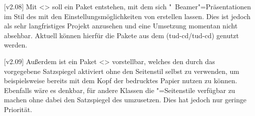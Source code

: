 [v2.08]
Mit <> soll ein Paket entstehen, mit dem sich
"~Beamer"=Präsentationen im Stil des \TUDCDs mit den 
Einstellungsmöglichkeiten von \TUDScript erstellen lassen. Dies ist jedoch als 
sehr langfristiges Projekt anzusehen und eine Umsetzung momentan nicht 
absehbar. Aktuell können hierfür die Pakete aus dem \GitHubRepo(tud-cd/tud-cd) 
genutzt werden.

[v2.09]
Außerdem ist ein Paket <> vorstellbar, welches den durch 
das \CD vorgegebene Satzspiegel aktiviert ohne den Seitenstil selbst zu 
verwenden, um beispielsweise bereits mit dem Kopf der \TnUD bedrucktes Papier 
nutzen zu können. Ebenfalls wäre es denkbar, für andere Klassen die 
"=Seitenstile verfügbar zu machen ohne dabei den 
Satzspiegel des \CDs umzusetzen. Dies hat jedoch nur geringe Priorität.

